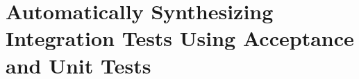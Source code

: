 \chapter{Automatically Synthesizing Integration Tests Using Acceptance and Unit Tests}
\label{chap:assist}
